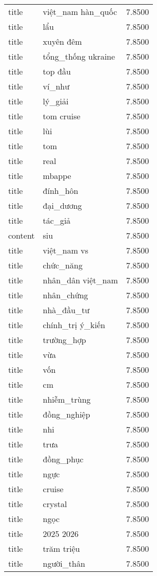 \documentclass{article}
\begin{document}
\begin{tabular}{lll}
title & việt\_nam hàn\_quốc & 7.8500\\
title & lẩu & 7.8500\\
title & xuyên đêm & 7.8500\\
title & tổng\_thống ukraine & 7.8500\\
title & top đầu & 7.8500\\
title & ví\_như & 7.8500\\
title & lý\_giải & 7.8500\\
title & tom cruise & 7.8500\\
title & lùi & 7.8500\\
title & tom & 7.8500\\
title & real & 7.8500\\
title & mbappe & 7.8500\\
title & đính\_hôn & 7.8500\\
title & đại\_dương & 7.8500\\
title & tác\_giả & 7.8500\\
content & siu & 7.8500\\
title & việt\_nam vs & 7.8500\\
title & chức\_năng & 7.8500\\
title & nhân\_dân việt\_nam & 7.8500\\
title & nhân\_chứng & 7.8500\\
title & nhà\_đầu\_tư & 7.8500\\
title & chính\_trị ý\_kiến & 7.8500\\
title & trường\_hợp & 7.8500\\
title & vừa & 7.8500\\
title & vốn & 7.8500\\
title & cm & 7.8500\\
title & nhiễm\_trùng & 7.8500\\
title & đồng\_nghiệp & 7.8500\\
title & nhi & 7.8500\\
title & trưa & 7.8500\\
title & đồng\_phục & 7.8500\\
title & ngực & 7.8500\\
title & cruise & 7.8500\\
title & crystal & 7.8500\\
title & ngọc & 7.8500\\
title & 2025 2026 & 7.8500\\
title & trăm triệu & 7.8500\\
title & người\_thân & 7.8500\\

\end{tabular}
\end{document}
